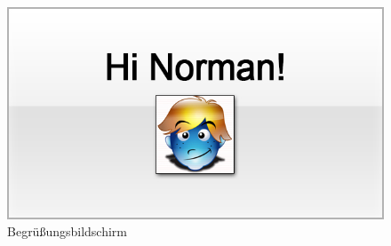 
\begin{figure}[H]
\centering
\includegraphics[scale=0.55]{../gui/_jpeg_numeration/welcome.jpg}
\caption{Begrüßungsbildschirm}
\label{fig:Begrussungsbildschirm}
\end{figure}



